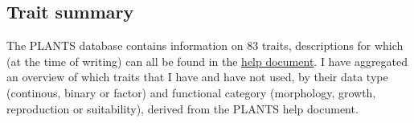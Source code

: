 \documentclass[
  10pt,
]{article}
\begin{document}
\newpage

\hypertarget{appendixTrait}{%
\subsection{Trait summary}\label{appendixTrait}}

The PLANTS database contains information on 83 traits, descriptions for which (at the time of writing) can all be found in the \href{https://plants.usda.gov/assets/docs/PLANTS_Help_Document.pdf}{help document}. I have aggregated an overview of which traits that I have and have not used, by their data type (continous, binary or factor) and functional category (morphology, growth, reproduction or suitability), derived from the PLANTS help document.

\begin{table}[!h]


\end{table}
\end{document}
